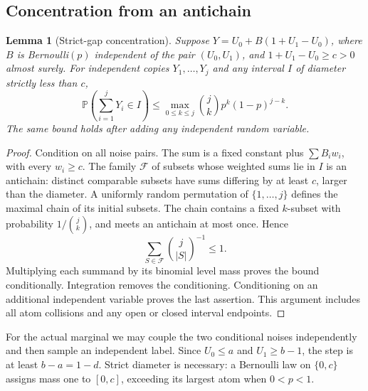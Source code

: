 \documentclass[11pt,a4paper]{article}
\numberwithin{equation}{section}
\newtheorem{lemma}[theorem]{Lemma}
\theoremstyle{definition}
\theoremstyle{remark}
\newcommand{\Pp}{\mathbb P}
\begin{document}
\subsection{Concentration from an antichain}
\begin{lemma}[Strict-gap concentration]
Suppose $Y=U_0+B(1+U_1-U_0)$, where $B$ is Bernoulli$(p)$ independent
of the pair $(U_0,U_1)$, and $1+U_1-U_0\ge c>0$ almost surely.
For independent copies $Y_1,\ldots,Y_j$ and any interval $I$ of diameter
strictly less than $c$,
\[
 \Pp\left(\sum_{i=1}^jY_i\in I\right)
 \le \max_{0\le k\le j}\binom jk p^k(1-p)^{j-k}.
\]
The same bound holds after adding any independent random variable.
\end{lemma}
\begin{proof}
Condition on all noise pairs. The sum is a fixed constant plus
$\sum B_iw_i$, with every $w_i\ge c$. The family $\mathcal F$ of subsets
whose weighted sums lie in $I$ is an antichain: distinct comparable
subsets have sums differing by at least $c$, larger than the diameter.
A uniformly random permutation of $\{1,\ldots,j\}$ defines the maximal
chain of its initial subsets. The chain contains a fixed $k$-subset with
probability $1/\binom jk$, and meets an antichain at most once. Hence
\[
 \sum_{S\in\mathcal F}\binom j{|S|}^{-1}\le1.
\]
Multiplying each summand by its binomial level mass proves the bound
conditionally. Integration removes the conditioning. Conditioning on an
additional independent variable proves the last assertion. This argument
includes all atom collisions and any open or closed interval endpoints.
\end{proof}
For the actual marginal we may couple the two conditional noises
independently and then sample an independent label. Since $U_0\le a$ and
$U_1\ge b-1$, the step is at least $b-a=1-d$.
Strict diameter is necessary: a Bernoulli law on $\{0,c\}$ assigns mass
one to $[0,c]$, exceeding its largest atom when $0<p<1$.
\end{document}
